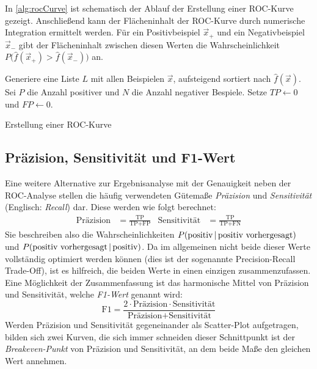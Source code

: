 			In \autoref{alg:rocCurve} ist schematisch der Ablauf der Erstellung einer ROC-Kurve gezeigt. Anschließend kann der Flächeninhalt der ROC-Kurve durch numerische Integration ermittelt werden. Für ein Positivbeispiel \( \vec{x}_+ \) und ein Negativbeispiel \( \vec{x}_- \) gibt der Flächeninhalt zwischen diesen Werten die Wahrscheinlichkeit \( P\big( \hat{f}(\vec{x}_+) > \hat{f}(\vec{x}_-) \big) \) an.

			\begin{algorithm}
				Generiere eine Liste \(L\) mit allen Beispielen \(\vec{x}\), aufsteigend sortiert nach \( \hat{f}(\vec{x}) \). \;
				Sei \(P\) die Anzahl positiver und \(N\) die Anzahl negativer Bespiele. \;
				Setze \( \mathit{TP} \gets 0 \) und \( \mathit{FP} \gets 0 \). \;
				\caption{Erstellung einer ROC-Kurve}
				\label{alg:rocCurve}
			\end{algorithm}

		\subsection{Präzision, Sensitivität und F1-Wert}
			Eine weitere Alternative zur Ergebnisanalyse mit der Genauigkeit neben der ROC-Analyse stellen die häufig verwendeten Gütemaße \emph{Präzision} und \emph{Sensitivität} (Englisch: \emph{Recall}) dar. Diese werden wie folgt berechnet:
			\begin{align}
				\text{Präzision} &= \frac{\text{TP}}{\text{TP} + \text{FP}}
				&
				\text{Sensitivität} &= \frac{\text{TP}}{\text{TP} + \text{FN}}
			\end{align}
			Sie beschreiben also die Wahrscheinlichkeiten \( P(\text{positiv} \,\vert\, \text{positiv vorhergesagt}) \) und \( P(\text{positiv vorhergesagt} \,\vert\, \text{positiv}) \). Da im allgemeinen nicht beide dieser Werte vollständig optimiert werden können (dies ist der sogenannte Precision-Recall Trade-Off), ist es hilfreich, die beiden Werte in einen einzigen zusammenzufassen. Eine Möglichkeit der Zusammenfassung ist das harmonische Mittel von Präzision und Sensitivität, welche \emph{F1-Wert} genannt wird:
			\begin{equation}
				\text{F1} = \frac{2 \cdot \text{Präzision} \cdot \text{Sensitivität}}{\text{Präzision} + \text{Sensitivität}}
			\end{equation}
			Werden Präzision und Sensitivität gegeneinander als Scatter-Plot aufgetragen, bilden sich zwei Kurven, die sich immer schneiden dieser Schnittpunkt ist der \emph{Breakeven-Punkt} von Präzision und Sensitivität, an dem beide Maße den gleichen Wert annehmen.

